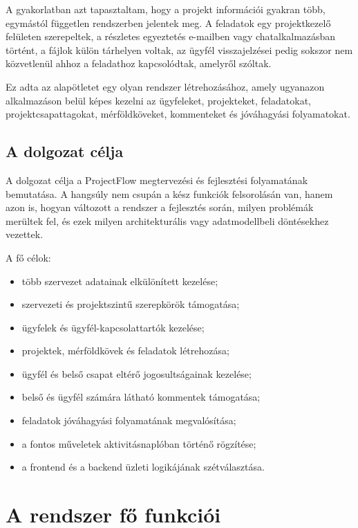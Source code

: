 \documentclass[11pt,a4paper]{report}
\newcommand{\projectname}{ProjectFlow}
\begin{document}
    A gyakorlatban azt tapasztaltam, hogy a projekt információi gyakran több,
    egymástól független rendszerben jelentek meg. A feladatok egy projektkezelő
    felületen szerepeltek, a részletes egyeztetés e-mailben vagy chatalkalmazásban
    történt, a fájlok külön tárhelyen voltak, az ügyfél visszajelzései pedig sokszor
    nem közvetlenül ahhoz a feladathoz kapcsolódtak, amelyről szóltak.

    Ez adta az alapötletet egy olyan rendszer létrehozásához, amely ugyanazon
    alkalmazáson belül képes kezelni az ügyfeleket, projekteket, feladatokat,
    projektcsapattagokat, mérföldköveket, kommenteket és jóváhagyási folyamatokat.

    \section{A dolgozat célja}

    A dolgozat célja a \projectname{} megtervezési és fejlesztési folyamatának
    bemutatása. A hangsúly nem csupán a kész funkciók felsorolásán van, hanem azon
    is, hogyan változott a rendszer a fejlesztés során, milyen problémák merültek
    fel, és ezek milyen architekturális vagy adatmodellbeli döntésekhez vezettek.

    A fő célok:
    \begin{itemize}
        \item több szervezet adatainak elkülönített kezelése;
        \item szervezeti és projektszintű szerepkörök támogatása;
        \item ügyfelek és ügyfél-kapcsolattartók kezelése;
        \item projektek, mérföldkövek és feladatok létrehozása;
        \item ügyfél és belső csapat eltérő jogosultságainak kezelése;
        \item belső és ügyfél számára látható kommentek támogatása;
        \item feladatok jóváhagyási folyamatának megvalósítása;
        \item a fontos műveletek aktivitásnaplóban történő rögzítése;
        \item a frontend és a backend üzleti logikájának szétválasztása.
    \end{itemize}

    \chapter{A rendszer fő funkciói}
\end{document}
